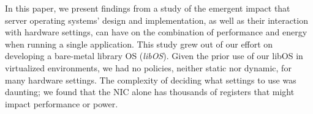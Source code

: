 In this paper, we present findings from a  study of the emergent impact that server operating systems' design and implementation, as well as their interaction with hardware settings, can have on the combination of performance and energy when running a single application.
This study grew out of our effort on developing a bare-metal library OS ({\em libOS}).
%
Given the prior use of our libOS in virtualized environments, we had no policies, neither static nor dynamic, for many hardware settings.  
The complexity of deciding what settings to use was daunting; we found that the NIC alone has thousands of registers that might impact performance or power.  




